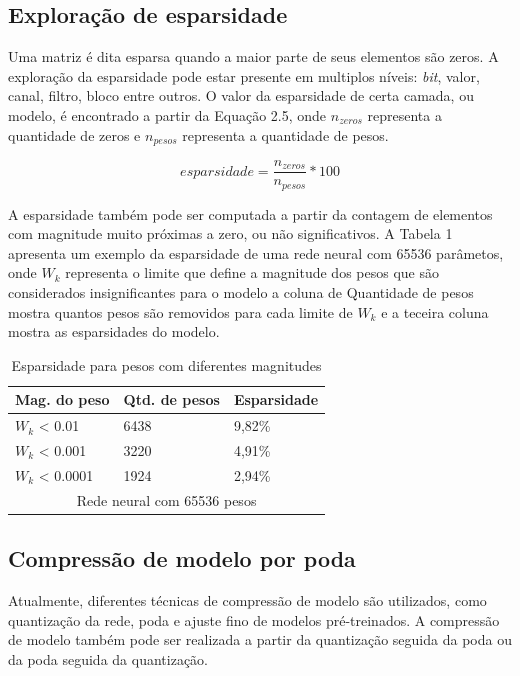 \subsection{Exploração de esparsidade}

Uma matriz é dita esparsa quando a maior parte de seus elementos são zeros. A exploração da esparsidade pode estar presente em multiplos níveis: \textit{bit}, valor, canal, filtro, bloco entre outros. O valor da esparsidade de certa camada, ou modelo, é encontrado a partir da Equação 2.5, onde $n_{zeros}$ representa a quantidade de zeros e $n_{pesos}$ representa a quantidade de pesos.

\begin{equation}
    esparsidade = \frac{n_{zeros}}{n_{pesos}}*100%
\end{equation}

A esparsidade também pode ser computada a partir da contagem de elementos com magnitude muito próximas a zero, ou não significativos. A Tabela 1 apresenta um exemplo da esparsidade de uma rede neural com 65536 parâmetos, onde $W_k$ representa o limite que define a magnitude dos pesos que são considerados insignificantes para o modelo a coluna de Quantidade de pesos mostra quantos pesos são removidos para cada limite de $W_k$ e a teceira coluna mostra as esparsidades do modelo.

\begin{table}[H]
    \centering
    \begin{tabular}{ |p{3cm}|p{3cm}|p{3cm}|  }
 \hline
 Mag. do peso&Qtd. de pesos&Esparsidade \\
 \hline
    $W_k$ < 0.01            &6438    &   9,82\%\\
    $W_k$ < 0.001           &3220    &   4,91\%\\
    $W_k$ < 0.0001          &1924    &   2,94\%\\
 \hline
 \multicolumn{3}{|c|}{Rede neural com 65536 pesos} \\
 \hline
\end{tabular}
    \caption{Esparsidade para pesos com diferentes magnitudes}
    \label{tab:my_label}
\end{table}

\subsection{Compressão de modelo por poda}
Atualmente, diferentes técnicas de compressão de modelo são utilizados, como quantização da rede, poda e ajuste fino de modelos pré-treinados. A compressão de modelo também pode ser realizada a partir da quantização seguida da poda ou da poda seguida da quantização. 

